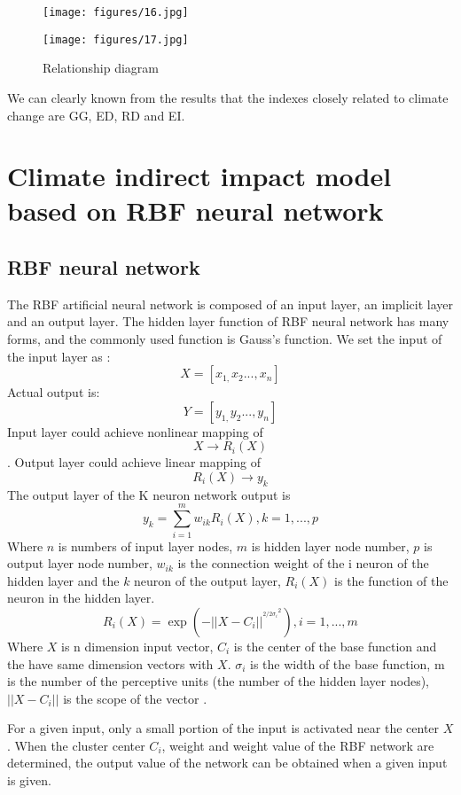 \documentclass{mcmthesis}
\begin{document}
\begin{figure}[htbp]
\centering
\begin{minipage}{5cm}
\centering
\texttt{[image: figures/16.jpg]}
\label{figure5}
\end{minipage}
\begin{minipage}{5cm}
\centering
\texttt{[image: figures/17.jpg]}
\label{figure6}
\end{minipage}
\caption{Relationship diagram}
\end{figure}

We can clearly known from the results that the indexes closely related to climate change are GG, ED, RD and EI.

\section{Climate indirect impact model based on RBF neural network}
\subsection{RBF neural network}
The RBF artificial neural network is composed of an input layer, an implicit layer and an output layer. The hidden layer function of RBF neural network has many forms, and the commonly used function is Gauss's function. We set the input of the input layer as :
\[X = [{x_{1,}}{x_2}...,{x_n}]\]
Actual output is:
\[Y = [{y_{1,}}{y_2}...,{y_n}]\]
Input layer could achieve nonlinear mapping of \[X \to {R_i}(X)\]. Output layer could achieve linear mapping of 
\[{R_i}(X) \to {y_k}\] 
 The output layer of the K neuron network output is
\[{y_k} = \sum\limits_{i = 1}^m {{w_{ik}}{R_i}} (X),k = 1,...,p\]
Where $n$ is numbers of input layer nodes, $m$ is hidden layer node number, $p$ is output layer node number,  $w_{ik}$ is the connection weight of the i neuron of the hidden layer and the $k$ neuron of the output layer, ${R_i}(X)$ is the function of the neuron in the hidden layer.
\[{R_i}(X) = \exp ( - ||X - {C_i}|{|^{{{^{2/2{\sigma _i}}}^2}}}),i = 1,...,m\]
Where $X$ is n dimension input vector, $C_i$ is the center of the base function and the have same dimension vectors with $X$. $\sigma_i$ is the width of the base function, m is the number of the perceptive units (the number of the hidden layer nodes), ${||X - {C_i}||}$ is the scope of the vector  .

For a given input, only a small portion of the input is activated near the center $X$. When the cluster center $C_i$, weight and weight value of the RBF network are determined, the output value of the network can be obtained when a given input is given.
\end{document}

